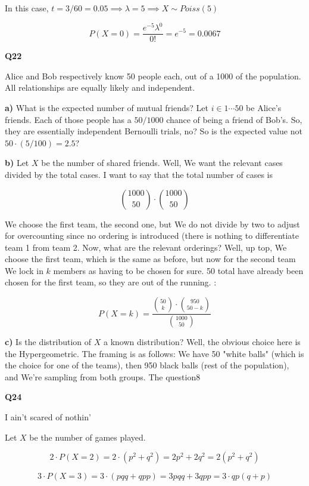 \documentclass{article}
\begin{document}
		In this case, $t = 3/60 = 0.05 \implies \lambda = 5\implies X\sim Poiss(5)$
		
		\[ P(X = 0) = \frac{e^{-5}\lambda^0}{0!}  = e^{-5} = 0.0067\] 
		
		 \hfill
		 
		 \textbf{Q22}
		 
		 Alice and Bob respectively know 50 people each, out of a 1000 of the population. All relationships are equally likely and independent. 
		 
		\textbf{a)} What is the expected number of mutual friends? Let $i \in 1\cdots50$ be Alice's friends. Each of those people has a $50/1000$ chance of being a friend of Bob's. So, they are essentially independent Bernoulli trials, no? So is the expected value not $50\cdot (5/100) = 2.5$?
		
		\textbf{b)} Let $X$ be the number of shared friends. Well, We want the relevant cases divided by the total cases. I want to say that the total number of cases is 
		
		\[ {1000\choose 50}\cdot{1000\choose 50} \]
		
		We choose the first team, the second one, but We do not divide by two to adjust for overcounting since no ordering is introduced (there is nothing to differentiate team 1 from team 2. Now, what are the relevant orderings? Well, up top, We choose the first team, which is the same as before, but now for the second team We lock in $k$ members as having to be chosen for sure. 50 total have already been chosen for the first team, so they are out of the running. :
		
		\[P(X = k) = \frac{{50\choose k}\cdot{950\choose 50-k}}{{1000\choose 50}} \]
		
		\textbf{c)} Is the distribution of $X$ a known distribution? Well, the obvious choice here is the Hypergeometric. The framing is as follows: We have 50 "white balls" (which is the choice for one of the teams), then 950 black balls (rest of the population), and We're sampling from both groups. The question8   
		
		\hfill
		
		\textbf{Q24}
		
		I ain't scared of nothin'
		
		Let $X$ be the number of games played. 
		
		\[ 2 \cdot P(X = 2) = 2\cdot (p^2+q^2) = 2p^2 + 2q^2 = 2(p^2+q^2)\]
		
		\[ 3 \cdot P(X = 3) = 3\cdot (pqq + qpp) = 3pqq + 3qpp = 3\cdot qp(q+p)\]
		
\end{document}

